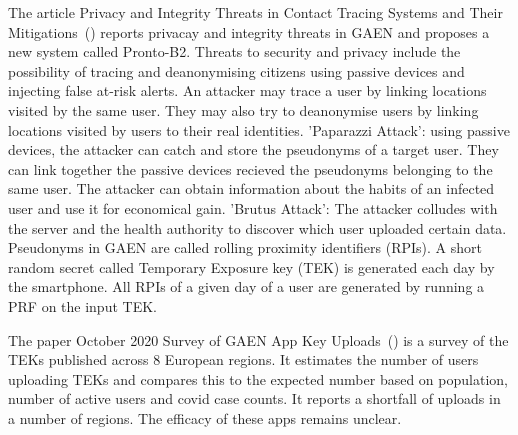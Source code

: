 The article Privacy and Integrity Threats in Contact
Tracing Systems and Their Mitigations~(\cite{9928557}) reports privacay and integrity threats in GAEN and proposes a new system called Pronto-B2. Threats to security and privacy include the possibility of tracing and deanonymising citizens using passive devices and injecting false at-risk alerts. An attacker may trace a user by linking locations visited by the same user. They may also try to deanonymise users by linking locations visited by users to their real identities. 'Paparazzi Attack': using passive devices, the attacker can catch and store the pseudonyms of a target user. They can link together the passive devices recieved the pseudonyms belonging to the same user. The attacker can obtain information about the habits of an infected user and use it for economical gain. 'Brutus Attack': The attacker colludes with the server and the health authority to discover which user uploaded certain data. Pseudonyms in GAEN are called rolling proximity identifiers (RPIs). A short random secret called Temporary Exposure key (TEK) is generated each day by the smartphone. All RPIs of a given day of a user are generated by running a PRF on the input TEK.

The paper October 2020 Survey of GAEN App Key Uploads~(\cite{survey}) is a survey of the TEKs published across 8 European regions. It estimates the number of users uploading TEKs and compares this to the expected number based on population, number of active users and covid case counts. It reports a shortfall of uploads in a number of regions. The efficacy of these apps remains unclear.


